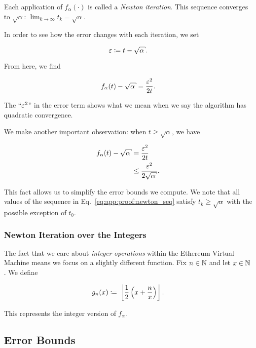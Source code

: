 \noindent
Each application of $f_{\alpha}(\cdot)$ is called a \emph{Newton iteration}.
This sequence converges to $\sqrt{\alpha}$:
$\lim_{k\to\infty} t_{k} = \sqrt{\alpha}$.

In order to see how the error changes with each iteration,
we set

\begin{equation}
    \eps \mathDef{} t - \sqrt{\alpha}.
\end{equation}

\noindent
From here, we find

\begin{equation}
    f_{\alpha}(t) - \sqrt{\alpha} = \frac{\eps^{2}}{2t}.
    \label{eq:app:error_equality}
\end{equation}

\noindent
The ``$\varepsilon^{2}$'' in the error term shows what we mean
when we say the algorithm has quadratic convergence.

We make another important observation:
when $t\ge\sqrt{\alpha}$, we have

\begin{align}
    f_{\alpha}(t) - \sqrt{\alpha} &= \frac{\eps^{2}}{2t} \nonumber\\
        &\le \frac{\eps^{2}}{2\sqrt{\alpha}}.
    \label{eq:app:error_inequality}
\end{align}

\noindent
This fact allows us to simplify the error bounds we compute.
We note that all values of the sequence
in Eq.~\eqref{eq:app:proof:newton_seq}
satisfy $t_{k}\ge\sqrt{\alpha}$
with the possible exception of $t_{0}$.

\subsubsection{Newton Iteration over the Integers}

The fact that we care about \emph{integer operations} within
the Ethereum Virtual Machine means we focus on a slightly different function.
Fix $n\in\mathbb{N}$ and let $x\in\mathbb{N}$.
We define

\begin{equation}
    g_{n}(x) \coloneqq{} \left\lfloor \frac{1}{2}\left( x + \frac{n}{x} \right) \right\rfloor.
\end{equation}

\noindent
This represents the integer version of $f_{\alpha}$.


\subsection{Error Bounds}

